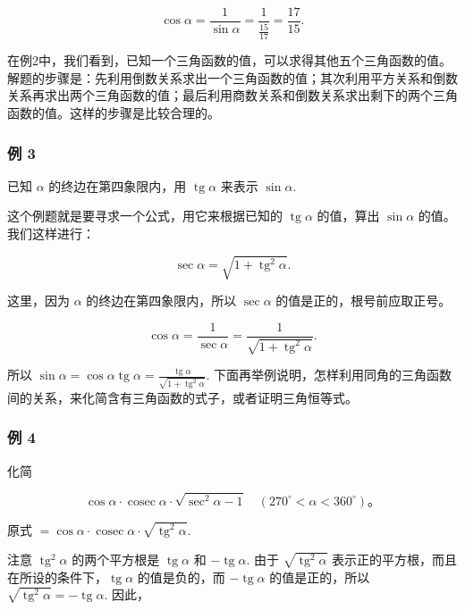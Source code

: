 \[
\cos \alpha = \frac {1}{\sin \alpha} = \frac {1}{\frac {15}{17}} = \frac {17}{15}.
\]

在例2中，我们看到，已知一个三角函数的值，可以求得其他五个三角函数的值。解题的步骤是：先利用倒数关系求出一个三角函数的值；其次利用平方关系和倒数关系再求出两个三角函数的值；最后利用商数关系和倒数关系求出剩下的两个三角函数的值。这样的步骤是比较合理的。

\subsubsection{例 3}

已知 \(\alpha\) 的终边在第四象限内，用 \(\operatorname{tg} \alpha\)
来表示 \(\sin \alpha\).

 这个例题就是要寻求一个公式，用它来根据已知的
\(\operatorname{tg} \alpha\) 的值，算出 \(\sin \alpha\)
的值。我们这样进行：

\[
\sec \alpha = \sqrt {1 + \operatorname{tg} ^ {2} \alpha}.
\]

这里，因为 \(\alpha\) 的终边在第四象限内，所以 \(\sec \alpha\)
的值是正的，根号前应取正号。

\[
\cos \alpha = \frac {1}{\sec \alpha} = \frac {1}{\sqrt {1 + \operatorname{tg} ^ {2} \alpha}}.
\]

所以
\(\sin \alpha = \cos \alpha \operatorname{tg} \alpha = \frac{\operatorname{tg} \alpha}{\sqrt{1 + \operatorname{tg}^2 \alpha}}.\)
下面再举例说明，怎样利用同角的三角函数间的关系，来化简含有三角函数的式子，或者证明三角恒等式。

\subsubsection{例 4}

化简

\[
\cos \alpha \cdot \operatorname{cosec} \alpha \cdot \sqrt {\sec^ {2} \alpha - 1} \quad (270 ^{\circ} <   \alpha <   360 ^{\circ})\text{。}
\]

 原式
\(= \cos \alpha \cdot \operatorname{cosec} \alpha \cdot \sqrt{\operatorname{tg}^2\alpha}\).

注意 \(\operatorname{tg}^2\alpha\) 的两个平方根是
\(\operatorname{tg}\alpha\) 和 \(-\operatorname{tg}\alpha\). 由于
\(\sqrt{\operatorname{tg}^2\alpha}\)
表示正的平方根，而且在所设的条件下，\(\operatorname{tg}\alpha\)
的值是负的，而 \(-\operatorname{tg}\alpha\) 的值是正的，所以
\(\sqrt{\operatorname{tg}^2\alpha} = -\operatorname{tg}\alpha\). 因此，

